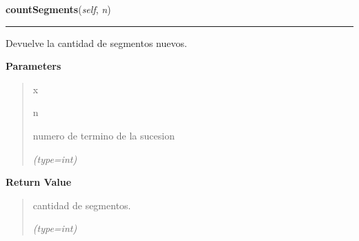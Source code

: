 \hspace{.8\funcindent}\begin{boxedminipage}{\funcwidth}

    \raggedright \textbf{countSegments}(\textit{self}, \textit{n})

    \vspace{-1.5ex}

    \rule{\textwidth}{0.5\fboxrule}
\setlength{\parskip}{2ex}
    Devuelve la cantidad de segmentos nuevos.

\setlength{\parskip}{1ex}
      \textbf{Parameters}
      \vspace{-1ex}

      \begin{quote}
        \begin{Ventry}{x}

          \item[n]

          numero de termino de la sucesion

            {\it (type=int)}

        \end{Ventry}

      \end{quote}

      \textbf{Return Value}
    \vspace{-1ex}

      \begin{quote}
      cantidad de segmentos.

      {\it (type=int)}

      \end{quote}

    \end{boxedminipage}

    \label{FractalZE:arbol:Arbol:totalLength}

    \vspace{0.5ex}

